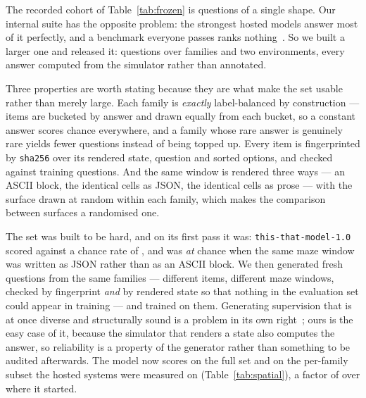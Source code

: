 \documentclass[11pt]{article}
\newcommand{\Ours}{\texttt{this-that-model-1.0}}
\newcommand{\1}{\mathbf{1}}
\begin{document}
The recorded cohort of Table~\ref{tab:frozen} is \frozenN{} questions of a single shape. Our
internal suite has the opposite problem: the strongest hosted models answer most of it perfectly,
and a benchmark everyone passes ranks nothing~\cite{kiela2021dynabench,srivastava2023beyond}. So we
built a larger one and released it: \spatialTotalN{} questions over \spatialFamilies{} families and
two environments, every answer computed from the simulator rather than annotated.

Three properties are worth stating because they are what make the set usable rather than merely
large. Each family is \emph{exactly} label-balanced by construction --- items are bucketed by
answer and drawn equally from each bucket, so a constant answer scores chance everywhere, and a
family whose rare answer is genuinely rare yields fewer questions instead of being topped up. Every
item is fingerprinted by \texttt{sha256} over its rendered state, question and sorted options, and
checked against \trainFingerprints{} training questions. And the same window is rendered three ways
--- an ASCII block, the identical cells as JSON, the identical cells as prose --- with the surface
drawn at random within each family, which makes the comparison between surfaces a randomised one.

The set was built to be hard, and on its first pass it was: \Ours{} scored \spatialOursBefore{}
against a chance rate of \spatialChance{}, and was \emph{at} chance when the same maze window was
written as JSON rather than as an ASCII block. We then generated \trainQuestions{} fresh questions
from the same families --- different items, different maze windows, checked by fingerprint
\emph{and} by rendered state so that nothing in the evaluation set could appear in training --- and
trained on them. Generating supervision that is at once diverse and structurally sound is a
problem in its own right~\cite{cheng2026graphsynth,cheng2026circuitsynth,cheng2026causalsynth};
ours is the easy case of it, because the simulator that renders a state also computes the
answer, so reliability is a property of the generator rather than something to be audited
afterwards. The model now scores \spatialOursAcc{} on the full set and \spatialOursSubset{} on
the per-family subset the hosted systems were measured on (Table~\ref{tab:spatial}), a factor of
\spatialOursGain{} over where it started.
\end{document}
